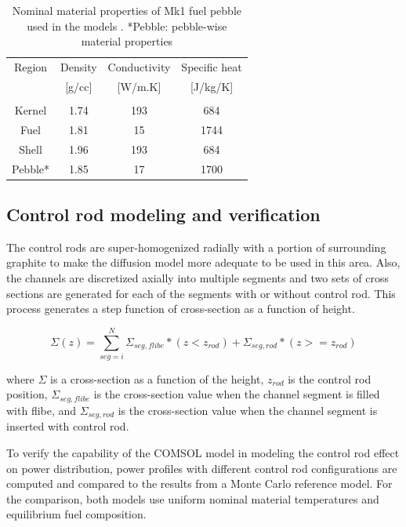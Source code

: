 \documentclass{elsarticle}
\begin{document}
\begin{table}
  \centering
  \begin{tabular}{cccc}
    Region&Density&Conductivity&Specific heat\\
    &[g/cc]&[W/m.K]&[J/kg/K]\\
    \hline\\
    Kernel & 1.74  & 193 & 684\\ %
    Fuel & 1.81 & 15 & 1744\\
    Shell & 1.96 & 193 & 684\\
    Pebble* & 1.85 & 17 & 1700 \\
  \end{tabular}
  \caption{Nominal material properties of Mk1 fuel pebble used in the models \cite{Hu2010}\cite{FHR2013}. *Pebble: pebble-wise material properties}
  \label{tab:pb_prop_mk1}
\end{table}

 
 



 


\newpage 
\subsection{Control rod modeling and verification}
The control rods are super-homogenized radially with a portion of surrounding graphite to make the diffusion model more adequate to be used in this area. Also, the channels are discretized axially into multiple segments and two sets of cross sections are generated for each of the segments with or without control rod. This process generates a step function of cross-section as a function of height. 

\begin{equation}
    \Sigma(z) = \sum_{seg = i}^{N} \Sigma_{seg, flibe}*(z<z_{rod}) + \Sigma_{seg, rod}*(z>=z_{rod})
\end{equation}

where $\Sigma$ is a cross-section as a function of the height, $z_{rod}$ is the control rod position, $\Sigma_{seg, flibe}$ is the cross-section value when the channel segment is filled with flibe, and $\Sigma_{seg, rod}$ is the cross-section value when the channel segment is inserted with control rod. 

To verify the capability of the COMSOL model in modeling the control rod effect on power distribution, power profiles with different control rod configurations are computed and compared to the results from a Monte Carlo reference model. 
For the comparison, both models use uniform nominal material temperatures and equilibrium fuel composition.
\end{document}

